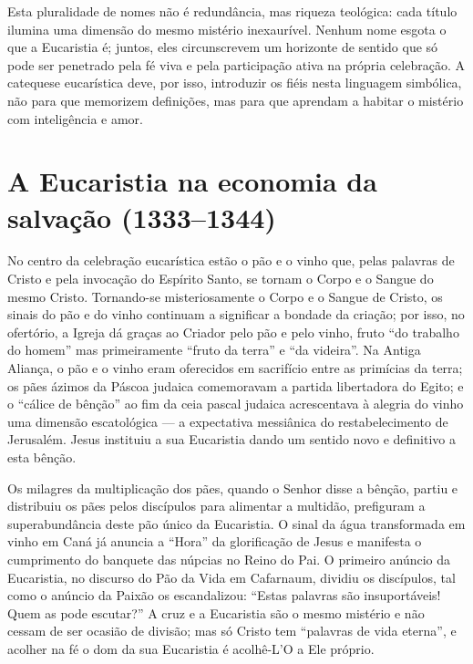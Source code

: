 Esta pluralidade de nomes não é redundância, mas riqueza teológica: cada título ilumina uma dimensão do mesmo mistério inexaurível. Nenhum nome esgota o que a Eucaristia é; juntos, eles circunscrevem um horizonte de sentido que só pode ser penetrado pela fé viva e pela participação ativa na própria celebração. A catequese eucarística deve, por isso, introduzir os fiéis nesta linguagem simbólica, não para que memorizem definições, mas para que aprendam a habitar o mistério com inteligência e amor.

\section{A Eucaristia na economia da salvação (1333--1344)}

No centro da celebração eucarística estão o pão e o vinho que, pelas palavras de Cristo e pela invocação do Espírito Santo, se tornam o Corpo e o Sangue do mesmo Cristo. Tornando-se misteriosamente o Corpo e o Sangue de Cristo, os sinais do pão e do vinho continuam a significar a bondade da criação; por isso, no ofertório, a Igreja dá graças ao Criador pelo pão e pelo vinho, fruto ``do trabalho do homem'' mas primeiramente ``fruto da terra'' e ``da videira''. Na Antiga Aliança, o pão e o vinho eram oferecidos em sacrifício entre as primícias da terra; os pães ázimos da Páscoa judaica comemoravam a partida libertadora do Egito; e o ``cálice de bênção'' ao fim da ceia pascal judaica acrescentava à alegria do vinho uma dimensão escatológica --- a expectativa messiânica do restabelecimento de Jerusalém. Jesus instituiu a sua Eucaristia dando um sentido novo e definitivo a esta bênção.

Os milagres da multiplicação dos pães, quando o Senhor disse a bênção, partiu e distribuiu os pães pelos discípulos para alimentar a multidão, prefiguram a superabundância deste pão único da Eucaristia. O sinal da água transformada em vinho em Caná já anuncia a ``Hora'' da glorificação de Jesus e manifesta o cumprimento do banquete das núpcias no Reino do Pai. O primeiro anúncio da Eucaristia, no discurso do Pão da Vida em Cafarnaum, dividiu os discípulos, tal como o anúncio da Paixão os escandalizou: ``Estas palavras são insuportáveis! Quem as pode escutar?'' A cruz e a Eucaristia são o mesmo mistério e não cessam de ser ocasião de divisão; mas só Cristo tem ``palavras de vida eterna'', e acolher na fé o dom da sua Eucaristia é acolhê-L'O a Ele próprio.

